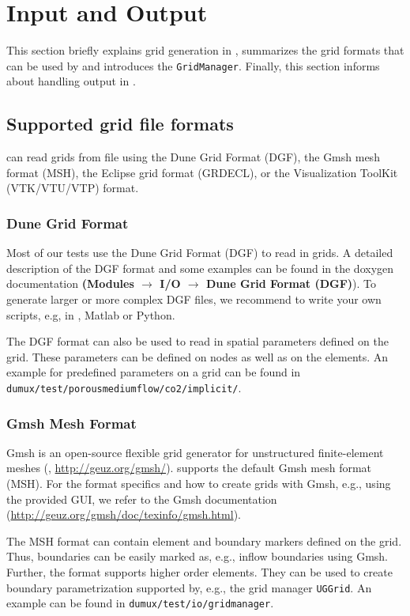 \section{Input and Output}
\label{sec:inputandoutput}

This section briefly explains grid generation in \Dumux, summarizes
the grid formats that can be used by \Dumux and introduces the \Dumux \texttt{GridManager}.
Finally, this section informs about handling output in \Dumux.

\subsection{Supported grid file formats}
\label{sec:supportedGridFormats}
\Dumux can read grids from file using the Dune Grid Format (DGF), the Gmsh mesh format (MSH), the Eclipse grid format (GRDECL), or the Visualization ToolKit (VTK/VTU/VTP) format. 

\subsubsection{Dune Grid Format}
Most of our \Dumux tests use the Dune Grid Format (DGF) to read in grids. A detailed description
of the DGF format and some examples can be found in the \Dune doxygen documentation
\textbf{(Modules $\rightarrow$ I/O $\rightarrow$ Dune Grid Format (DGF)}). To generate larger or more
complex DGF files, we recommend to write your own scripts, e.g, in \Cplusplus, Matlab or Python.

The DGF format can also be used to read in spatial parameters defined on the grid. These parameters can
be defined on nodes as well as on the elements. An example for predefined parameters on a grid
can be found in \texttt{dumux/test/porousmediumflow/co2/implicit/}.

\subsubsection{Gmsh Mesh Format}
Gmsh is an open-source flexible grid generator for unstructured finite-element meshes (\cite{GEUZAINE2009}, \url{http://geuz.org/gmsh/}).
\Dumux supports the default Gmsh mesh format (MSH). For the format specifics and how to create grids with Gmsh, e.g., using
the provided GUI, we refer to the Gmsh documentation (\url{http://geuz.org/gmsh/doc/texinfo/gmsh.html}).

The MSH format can contain element and boundary markers defined on the grid. Thus, boundaries can be easily marked as, e.g., inflow boundaries
using Gmsh. Further, the format supports higher order elements. They can be used to create boundary parametrization supported by, e.g., the grid
manager \texttt{UGGrid}.
An example can be found in \texttt{dumux/test\allowbreak/io/gridmanager}.

